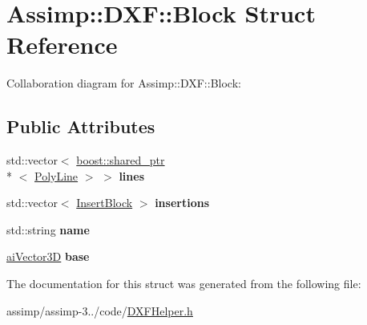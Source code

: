 \hypertarget{struct_assimp_1_1_d_x_f_1_1_block}{\section{Assimp\+:\+:D\+X\+F\+:\+:Block Struct Reference}
\label{struct_assimp_1_1_d_x_f_1_1_block}
}


Collaboration diagram for Assimp\+:\+:D\+X\+F\+:\+:Block\+:
\subsection*{Public Attributes}
\begin{DoxyCompactItemize}
\item 
\hypertarget{struct_assimp_1_1_d_x_f_1_1_block_a93d549945d7a995c95620b5d65f5ff46}{std\+::vector$<$ \hyperlink{classboost_1_1shared__ptr}{boost\+::shared\+\_\+ptr}\\*
$<$ \hyperlink{struct_assimp_1_1_d_x_f_1_1_poly_line}{Poly\+Line} $>$ $>$ {\bfseries lines}}\label{struct_assimp_1_1_d_x_f_1_1_block_a93d549945d7a995c95620b5d65f5ff46}

\item 
\hypertarget{struct_assimp_1_1_d_x_f_1_1_block_aef05d8bf560072accee942485334f6a0}{std\+::vector$<$ \hyperlink{struct_assimp_1_1_d_x_f_1_1_insert_block}{Insert\+Block} $>$ {\bfseries insertions}}\label{struct_assimp_1_1_d_x_f_1_1_block_aef05d8bf560072accee942485334f6a0}

\item 
\hypertarget{struct_assimp_1_1_d_x_f_1_1_block_a388a48d645985740b6d15820007f3f47}{std\+::string {\bfseries name}}\label{struct_assimp_1_1_d_x_f_1_1_block_a388a48d645985740b6d15820007f3f47}

\item 
\hypertarget{struct_assimp_1_1_d_x_f_1_1_block_a9741c07686f9fbc39a39af3fcd6f5d3a}{\hyperlink{structai_vector3_d}{ai\+Vector3\+D} {\bfseries base}}\label{struct_assimp_1_1_d_x_f_1_1_block_a9741c07686f9fbc39a39af3fcd6f5d3a}

\end{DoxyCompactItemize}


The documentation for this struct was generated from the following file\+:\begin{DoxyCompactItemize}
\item 
assimp/assimp-\/3../code/\hyperlink{_d_x_f_helper_8h}{D\+X\+F\+Helper.\+h}\end{DoxyCompactItemize}
